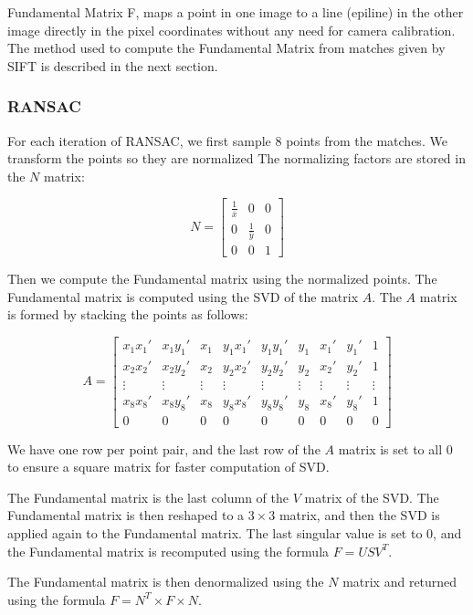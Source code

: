 \documentclass[10pt,twocolumn,letterpaper]{article}
\begin{document}
Fundamental Matrix F, maps a point in one image to a line (epiline) in the other image directly in the pixel coordinates without any need for camera calibration. The method used to compute the Fundamental Matrix from matches given by SIFT is described in the next section.


\subsubsection{RANSAC}
For each iteration of RANSAC\cite{fischlerRandomSampleConsensus1981}, we first sample 8 points from the matches.
We transform the points so  they are normalized
The normalizing factors are stored in the \(N\) matrix:

\[
N = \begin{bmatrix}
    \frac{1}{\bar{x}} & 0 & 0\\
    0 & \frac{1}{\bar{y}} & 0 \\
    0 & 0 & 1
\end{bmatrix}
\]

Then we compute the Fundamental matrix using the normalized points. The Fundamental matrix is computed using the SVD of the matrix \(A\). The \(A\) matrix is formed by stacking the points as follows:

\[
A = \begin{bmatrix}
    x_1x_1' & x_1y_1' & x_1 & y_1x_1' & y_1y_1' & y_1 & x_1' & y_1' & 1 \\
    x_2x_2' & x_2y_2' & x_2 & y_2x_2' & y_2y_2' & y_2 & x_2' & y_2' & 1 \\
    \vdots & \vdots & \vdots & \vdots & \vdots & \vdots & \vdots & \vdots & \vdots \\
    x_8x_8' & x_8y_8' & x_8 & y_8x_8' & y_8y_8' & y_8 & x_8' & y_8' & 1 \\
    0 & 0 & 0 & 0 & 0 & 0 & 0 & 0 & 0
\end{bmatrix}
\]

We have one row per point pair, and the last row of the \(A\) matrix is set to all 0 to ensure a square matrix for faster computation of SVD.

The Fundamental matrix is the last column of the \(V\) matrix of the SVD. The Fundamental matrix is then reshaped to a \(3 \times 3\) matrix, and then the SVD is applied again to the Fundamental matrix. The last singular value is set to 0, and the Fundamental matrix is recomputed using the formula \(F = USV^T\).

The Fundamental matrix is then denormalized using the \(N\) matrix and returned using the formula \(F = N^T \times F \times N\).
\end{document}
